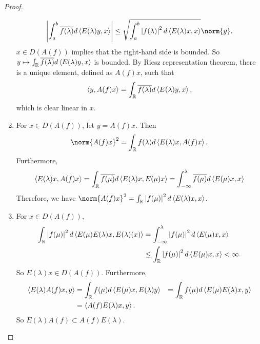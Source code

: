 \documentclass[a4paper,12pt]{article}
\begin{document}
\begin{proof}
\begin{enumerate}[label=(\arabic{*})]
        \begin{equation*}
            \abs{\int_a^b \clo{f(\lambda)} d\inn{E(\lambda)y,x}} \leq \sqrt{\int_a^b \abs{f(\lambda)}^2 d\inn{E(\lambda)x,x}}\norm{y}.
        \end{equation*}
        $x \in D(A(f))$ implies that the right-hand side is bounded. So $y \mapsto \int_{\mathbb{R}} \overline{f(\lambda)} d\left\langle E(\lambda)y,x \right\rangle$ is bounded. By Riesz representation theorem, there is a unique element, defined as $A(f)x$, such that 
        \begin{equation*}
            \left\langle y,A(f)x \right\rangle = \int_{\mathbb{R}} \overline{f(\lambda)} d\left\langle E(\lambda)y,x \right\rangle,
        \end{equation*}
        which is clear linear in $x$.

        \item For $x \in D(A(f))$, let $y = A(f)x$. Then
        \begin{equation*}
            \norm{A(f)x}^2 = \int_\R f(\lambda) d\inn{E(\lambda)x,A(f)x}.
        \end{equation*}
        Furthermore,
        \begin{equation*}
            \left\langle E(\lambda)x,A(f)x \right\rangle = \int_{\mathbb{R}} \overline{f(\mu)} d\left\langle E(\lambda)x,E(\mu)x \right\rangle = \int_{-\infty}^\lambda \overline{f(\mu)}d\left\langle E(\mu)x,x \right\rangle
        \end{equation*}
        Therefore, we have $\norm{A(f)x}^2 = \int_\R \abs{f(\mu)}^2 d \inn{E(\lambda)x,x}$.

        \item For $x \in D(A(f))$, 
        \begin{equation*}
            \begin{aligned}
                \int_{\mathbb{R}} \left\lvert f(\mu)\right\lvert^2 d \left\langle E(\mu)E(\lambda)x,E(\lambda)(x) \right\rangle &= \int_{-\infty}^\lambda \left\lvert f(\mu)\right\lvert^2 d\left\langle E(\mu)x,x \right\rangle \\
                &\leq \int_{\mathbb{R}}\left\lvert f(\mu)\right\lvert^2 d\left\langle E(\mu)x,x \right\rangle < \infty.
            \end{aligned}
        \end{equation*}
        So $E(\lambda)x \in D(A(f))$. Furthermore,
        \begin{equation*}
            \begin{aligned}
                \left\langle E(\lambda)A(f)x,y \right\rangle &= \int_{\mathbb{R}} f(\mu) d \left\langle E(\mu)x,E(\lambda)y \right\rangle
                &= \int_{\mathbb{R}} f(\mu) d \left\langle E(\mu)E(\lambda)x,y \right\rangle \\
                &= \left\langle A(f)E(\lambda)x,y \right\rangle.
            \end{aligned}
        \end{equation*}
        So $E(\lambda)A(f) \subset A(f)E(\lambda)$.


\end{enumerate}
\end{proof}
\end{document}
